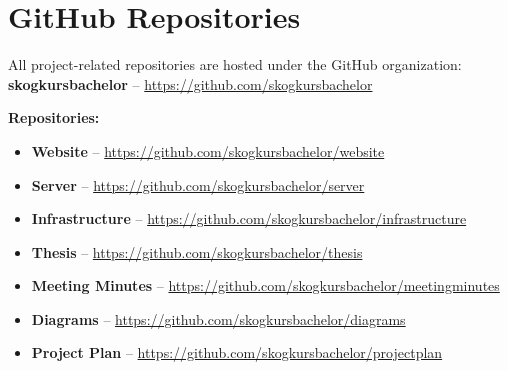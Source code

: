 \chapter{GitHub Repositories}
\label{appendix:github_repositories}

All project-related repositories are hosted under the GitHub organization: \\
\textbf{skogkursbachelor} – \url{https://github.com/skogkursbachelor}

\vspace{1em}

\noindent\textbf{Repositories:}
\begin{itemize}
\item \textbf{Website} – \url{https://github.com/skogkursbachelor/website}
\item \textbf{Server} – \url{https://github.com/skogkursbachelor/server}
\item \textbf{Infrastructure} – \url{https://github.com/skogkursbachelor/infrastructure}
\item \textbf{Thesis} – \url{https://github.com/skogkursbachelor/thesis}
\item \textbf{Meeting Minutes} – \url{https://github.com/skogkursbachelor/meetingminutes}
\item \textbf{Diagrams} – \url{https://github.com/skogkursbachelor/diagrams}
\item \textbf{Project Plan} – \url{https://github.com/skogkursbachelor/projectplan}
\end{itemize}